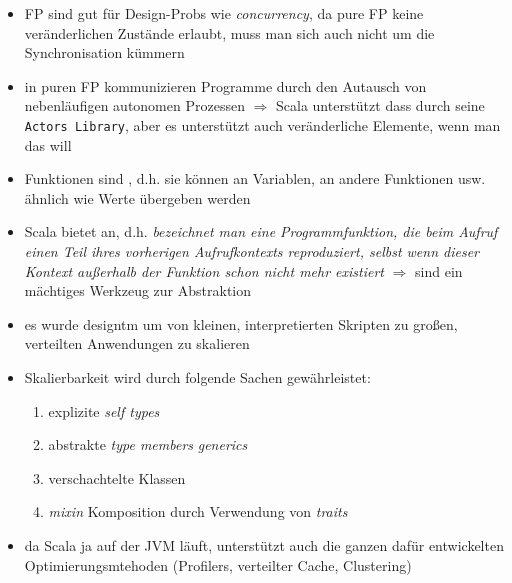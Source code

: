 \begin{itemize}
  \item FP sind gut für Design-Probs wie \textit{concurrency}, da pure FP
  keine veränderlichen Zustände erlaubt, muss man sich auch nicht um die
  Synchronisation kümmern
  \item in puren FP kommunizieren Programme durch den Autausch von
  nebenläufigen autonomen Prozessen $\Rightarrow$ Scala unterstützt dass
  durch seine \texttt{Actors Library}, aber es unterstützt auch
  veränderliche Elemente, wenn man das will
  \item Funktionen sind , d.h. sie können an Variablen, an
  andere Funktionen usw. ähnlich wie Werte übergeben werden
  \item Scala bietet  an, d.h. 
  \textit{bezeichnet man eine Programmfunktion, die beim Aufruf einen Teil ihres vorherigen Aufrufkontexts reproduziert, selbst wenn dieser Kontext außerhalb der Funktion schon nicht mehr existiert} $\Rightarrow$ sind
  ein mächtiges Werkzeug zur Abstraktion
\end{itemize}




\begin{itemize}
  \item es wurde designtm um von kleinen, interpretierten Skripten zu
  großen, verteilten Anwendungen zu skalieren
  \item Skalierbarkeit wird durch folgende Sachen gewährleistet:
  \begin{enumerate}
    \item explizite \textit{self types}
    \item abstrakte \textit{type members} \und \textit{generics}
    \item verschachtelte Klassen
    \item \textit{mixin} Komposition durch Verwendung von \textit{traits}
  \end{enumerate}
\end{itemize}




\begin{itemize}
  \item da Scala ja auf der JVM läuft, unterstützt auch die ganzen dafür
  entwickelten Optimierungsmtehoden (Profilers, verteilter Cache, Clustering)
\end{itemize}


